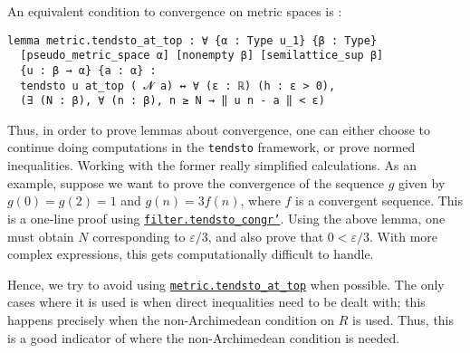 \documentclass[a4paper,UKenglish,cleveref, autoref, thm-restate]{lipics-v2021}
\newcommand{\lean}[1]{\texttt{#1}\xspace} %
\begin{document}
An equivalent condition to convergence on metric spaces is : 
\begin{lstlisting}
lemma metric.tendsto_at_top : ∀ {α : Type u_1} {β : Type} 
  [pseudo_metric_space α] [nonempty β] [semilattice_sup β] 
  {u : β → α} {a : α} : 
  tendsto u at_top ( 𝓝 a) ↔ ∀ (ε : ℝ) (h : ε > 0), 
  (∃ (N : β), ∀ (n : β), n ≥ N → ‖ u n - a ‖ < ε)
\end{lstlisting}
Thus, in order to prove lemmas about convergence, one can either choose to continue doing computations in the \lean{tendsto} framework, 
or prove normed inequalities. Working with the former really simplified 
calculations. %
As an example, suppose we want to prove the convergence of the sequence $g$ given by $g(0) = g(2) = 1$ and $g(n) = 3 f(n)$, 
where $f$ is a convergent sequence. This is a one-line proof using \href{https://leanprover-community.github.io/mathlib_docs/order/filter/basic.html#filter.tendsto_congr%27}{\lean{filter.tendsto\_congr'}}. 
Using the above lemma, one must obtain $N$ corresponding to $\varepsilon / 3$, and also prove that $0 < \varepsilon / 3$. 
With more complex expressions, this gets computationally difficult to handle. %

Hence, we try to avoid using \href{https://leanprover-community.github.io/mathlib_docs/topology/metric_space/basic.html#metric.tendsto_at_top}{\lean{metric.tendsto\_at\_top}} 
when possible. The only cases where it is used is when direct inequalities 
need to be dealt with; this happens precisely when the non-Archimedean condition on $R$ is used. Thus, this is a good 
indicator of where the non-Archimedean condition is needed.
\end{document}
